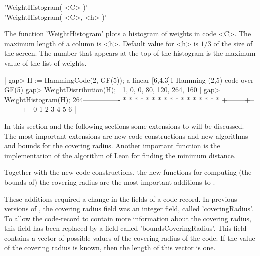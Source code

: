 'WeightHistogram( <C> )'\\
'WeightHistogram( <C>, <h> )'

The   function 'WeightHistogram'  plots  a histogram   of weights in code
<C>. The maximum   length of a column  is  <h>. Default value  for <h> is
$1/3$ of the  size of the  screen. The number  that appears at the top of
the histogram is the maximum value of the list of weights.

|    gap> H := HammingCode(2, GF(5));
    a linear [6,4,3]1 Hamming (2,5) code over GF(5)
    gap> WeightDistribution(H);
    [ 1, 0, 0, 80, 120, 264, 160 ]
    gap> WeightHistogram(H);
    264----------------
                   *
                   *
                   *
                   *
                   *  *
                *  *  *
             *  *  *  *
             *  *  *  *
    +--------+--+--+--+--
    0  1  2  3  4  5  6 |

\newcommand{\binomial}[2]{{{#1} \choose {#2}}}



In this section and the following sections 
some extensions to \GUAVA{} will be discussed.
The most important extensions are new code constructions
and new algorithms and bounds for the covering radius.
Another important function is the implementation of the algorithm
of Leon for finding the minimum distance.




Together with the new code constructions, the new functions for
computing (the bounds of) the covering radius are the most important
additions to \GUAVA.

These additions required a change in the fields of a code record.
In previous versions of \GUAVA{}, the covering radius field
was an integer field, called 'coveringRadius'.
To allow the code-record to contain more information about the
covering radius, this field has been replaced by a 
field called 'boundsCoveringRadius'.
This field contains a vector of possible values of the covering radius
of the code.
If the value of the covering radius is known, then the length of this
vector is one.

